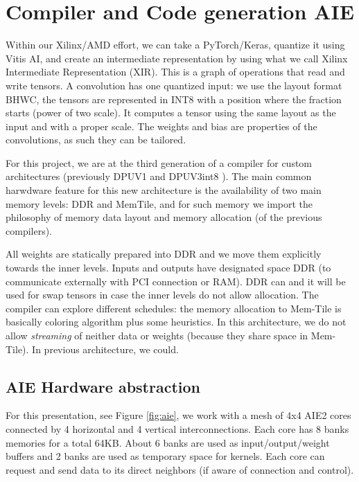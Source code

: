 \documentclass[conference]{IEEEtran}
\begin{document}
\section{Compiler and Code generation AIE}
\label{sec:compiler}
Within our Xilinx/AMD effort, we can take a PyTorch/Keras, quantize it
using Vitis AI, and create an intermediate representation by using
what we call Xilinx Intermediate Representation (XIR). This is a graph
of operations that read and write tensors. A convolution has one
quantized input: we use the layout format BHWC, the tensors are
represented in INT8 with a position where the fraction starts (power
of two scale). It computes a tensor using the same layout as the input
and with a proper scale. The weights and bias are properties of the
convolutions, as such they can be tailored.

For this project, we are at the third generation of a compiler for
custom architectures (previously DPUV1 and DPUV3int8
\cite{10.1145/3473334,abs-2110-04327}). The main common harwdware
feature for this new architecture is the availability of two main
memory levels: DDR and MemTile, and for such memory we import the
philosophy of memory data layout and memory allocation (of the
previous compilers).

All weights are statically prepared into DDR and we move them
explicitly towards the inner levels. Inputs and outputs have
designated space DDR (to communicate externally with PCI connection or
RAM). DDR can and it will be used for swap tensors in case the inner
levels do not allow allocation.  The compiler can explore different
schedules: the memory allocation to Mem-Tile is basically coloring
algorithm plus some heuristics. In this architecture, we do not allow
{\em streaming} of neither data or weights (because they share space
in Mem-Tile). In previous architecture, we could.

\subsection{AIE Hardware abstraction}


For this presentation, see Figure \ref{fig:aie}, we work with a mesh
of 4x4 AIE2 cores connected by 4 horizontal and 4 vertical
interconnections. Each core has 8 banks memories for a total
64KB. About 6 banks are used as input/output/weight buffers and 2
banks are used as temporary space for kernels. Each core can request
and send data to its direct neighbors (if aware of connection and
control).
\end{document}
